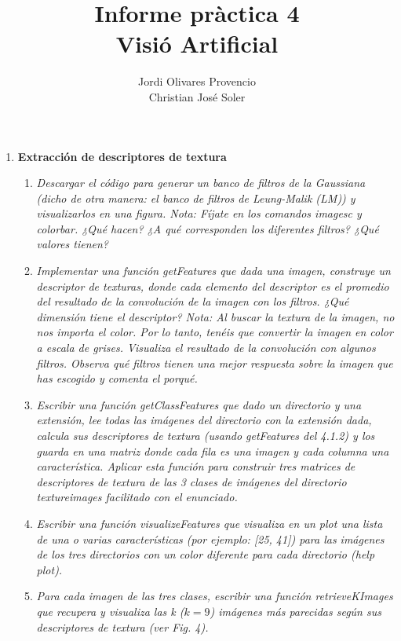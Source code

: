 \documentclass{article}
\title{Informe pràctica 4\\Visió Artificial}
\author{Jordi Olivares Provencio\\Christian José Soler}
\begin{document}
\maketitle

\begin{enumerate}

 \item \textbf{Extracción de descriptores de textura}

 \begin{enumerate}

 \item \textit{Descargar el código para generar un banco de filtros de la Gaussiana (dicho de otra manera: el banco de  filtros de Leung-Malik (LM)) y visualizarlos en una figura. Nota: Fíjate en los comandos imagesc y colorbar. ¿Qué hacen? ¿A qué corresponden los diferentes filtros? ¿Qué valores tienen?}
 
 \item \textit{  Implementar una  función getFeatures que dada una imagen, construye un descriptor de texturas, donde cada elemento del descriptor es el promedio del 
resultado de la convolución de la imagen con los filtros. ¿Qué dimensión tiene el descriptor? Nota: Al buscar la textura de la imagen, no nos importa el color. Por lo tanto, tenéis que convertir la imagen en color a escala de grises. Visualiza el  resultado de la convolución con algunos  filtros. Observa qué  filtros tienen  una  mejor  respuesta  sobre  la  imagen  que  has  escogido  y  comenta  el porqué. }

 \item \textit{ Escribir  una  función  getClassFeatures que dado  un  directorio  y  una extensión, lee todas las imágenes del directorio con la extensión dada, calcula sus descriptores de textura (usando getFeatures del 4.1.2) y los guarda en una matriz donde  cada  fila  es  una  imagen  y  cada  columna  una  característica.  Aplicar  esta función para construir tres matrices de descriptores de textura de las 3 clases de imágenes del directorio textureimages facilitado con el enunciado.}

 \item \textit{ Escribir una función visualizeFeatures que visualiza en un plot una lista de una o varias características (por ejemplo: [25, 41]) para las imágenes de los tres directorios con un color diferente para cada directorio (help plot).}

 \item \textit{ Para  cada imagen  de las  tres  clases,  escribir una  función  retrieveKImages que  recupera  y  visualiza  las  k  ($k=9$)  imágenes  más parecidas  según  sus descriptores de textura (ver Fig. 4).}


\end{enumerate}
\end{enumerate}
\end{document}
